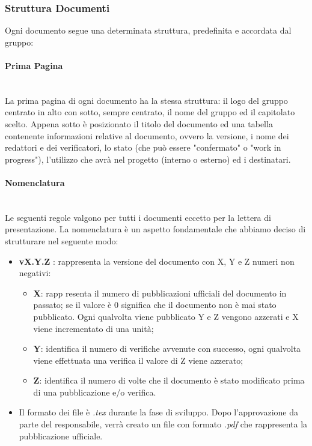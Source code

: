 \subsubsection{Struttura Documenti}\label{ProcessiSupporto_Documentazione_StrutturaDocumenti}
Ogni documento segue una determinata struttura, predefinita e accordata dal gruppo:

\paragraph{Prima Pagina} \-\\
La prima pagina di ogni documento ha la stessa struttura: il logo del gruppo centrato in alto con sotto, sempre centrato, il nome del gruppo ed il capitolato scelto. Appena sotto è posizionato il titolo del documento ed una tabella contenente informazioni relative al documento, ovvero la versione, i nome dei redattori e dei verificatori, lo stato (che può essere "confermato" o "work in progress"), l'utilizzo che avrà nel progetto (interno o esterno) ed i destinatari.

\paragraph{Nomenclatura} \-\\
Le seguenti regole valgono per tutti i documenti eccetto per la lettera di presentazione. La nomenclatura è un aspetto fondamentale che abbiamo deciso di strutturare nel seguente modo: 
\begin{itemize}
	\item \textbf{vX.Y.Z }: rappresenta la versione del documento con X, Y e Z numeri non negativi:
	\begin{itemize}
		\item \textbf{X}: rapp resenta il numero di pubblicazioni ufficiali del documento in passato; se il valore è 0 significa che il documento non è mai stato pubblicato. Ogni qualvolta viene pubblicato Y e Z vengono azzerati e X viene incrementato di una unità;
		\item \textbf{Y}: identifica il numero di verifiche avvenute con successo, ogni qualvolta viene effettuata una verifica il valore di Z viene azzerato;
		\item \textbf{Z}: identifica il numero di volte che il documento è stato modificato prima di una pubblicazione e/o verifica.
	\end{itemize}
	\item Il formato dei file è \textit{.tex} durante la fase di sviluppo. Dopo l'approvazione da parte del responsabile, verrà creato un file con formato \textit{.pdf} che rappresenta la pubblicazione ufficiale.
\end{itemize}

